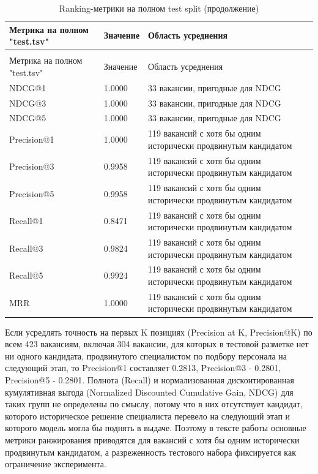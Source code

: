 \begingroup
\setlength{\tabcolsep}{3pt}
\renewcommand{\arraystretch}{1}
{\linespread{1}\selectfont
\begin{longtable}{|P{0.30\textwidth}|P{0.34\textwidth}|P{0.28\textwidth}|}
\caption{Ranking-метрики на полном test split}\label{tbl:ranking}\\*
\hline
Метрика на полном "test.tsv" & Значение & Область усреднения \\
\hline
\endfirsthead
\caption[]{Ranking-метрики на полном test split (продолжение)}\\*
\hline
Метрика на полном "test.tsv" & Значение & Область усреднения \\
\hline
\endhead
\hline
\endfoot
\hline
\endlastfoot
NDCG@1 & 1.0000 & 33 вакансии, пригодные для NDCG \\
\hline
NDCG@3 & 1.0000 & 33 вакансии, пригодные для NDCG \\
\hline
NDCG@5 & 1.0000 & 33 вакансии, пригодные для NDCG \\
\hline
Precision@1 & 1.0000 & 119 вакансий с хотя бы одним исторически продвинутым кандидатом \\
\hline
Precision@3 & 0.9958 & 119 вакансий с хотя бы одним исторически продвинутым кандидатом \\
\hline
Precision@5 & 0.9958 & 119 вакансий с хотя бы одним исторически продвинутым кандидатом \\
\hline
Recall@1 & 0.8471 & 119 вакансий с хотя бы одним исторически продвинутым кандидатом \\
\hline
Recall@3 & 0.9824 & 119 вакансий с хотя бы одним исторически продвинутым кандидатом \\
\hline
Recall@5 & 0.9924 & 119 вакансий с хотя бы одним исторически продвинутым кандидатом \\
\hline
MRR & 1.0000 & 119 вакансий с хотя бы одним исторически продвинутым кандидатом \\
\end{longtable}
}
\endgroup
Если усредлять точность на первых K позициях (Precision at K, Precision@K) по всем 423 вакансиям, включая 304 вакансии, для которых в тестовой разметке нет ни одного кандидата, продвинутого специалистом по подбору персонала на следующий этап, то Precision@1 составляет 0.2813, Precision@3 - 0.2801, Precision@5 - 0.2801. Полнота (Recall) и нормализованная дисконтированная кумулятивная выгода (Normalized Discounted Cumulative Gain, NDCG) для таких групп не определены по смыслу, потому что в них отсутствует кандидат, которого историческое решение специалиста перевело на следующий этап и которого модель могла бы поднять в выдаче. Поэтому в тексте работы основные метрики ранжирования приводятся для вакансий с хотя бы одним исторически продвинутым кандидатом, а разреженность тестового набора фиксируется как ограничение эксперимента.\par
